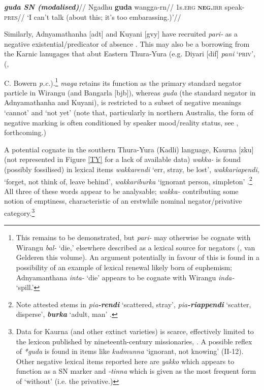 \documentclass[usenames,dvipsnames,11pt]{article}
\begin{document}
{\a\begingl\glpreamble \textbf{\em{guda} SN (modalised)}//
\gla Ngadhu \textbf{guda} wangga-rn//
\glb 1s.\textsc{erg} \textsc{\textbf{neg.}irr} speak\textsc{-pres}//
\glft`I can't talk (about this; it's too embarassing.)'//\endgl
\xe


 Similarly, Adnyamathanha [\gls{adt}] and Kuyani [\gls{gvy}] have recruited \textit{pari-} as a negative existential/predicator of absence \citep[141]{Hercus1999}. This may also be a borrowing from the Karnic lanugages that abut Eastern Thura-Yura (e.g. Diyari [\gls{dif}] \textit{pani} \textsc{`priv'}, (\citealt{Austin2011}, {C. Bowern \textit{p.c.}).\footnote{This remains to be demonstrated, but \textit{pari-} may otherwise be cognate with Wirangu \textit{bal-} `die,' elsewhere described as a lexical source for negators (\citealt{Veselinova2013}, van Gelderen this volume). An argument potentially in favour of this is found in a possibility of an example of lexical renewal likely born of euphemism; Adnyamanthana \textit{inta-} `die' appears to be cognate with Wirangu \textit{inda-} `spill.'}
\textit{maga} retains its function as the primary standard negator particle in Wirangu (and Bangarla [\gls{bjb}]),  whereas \textit{guda} (the standard negator in Adnyamathanha and Kuyani), is restricted to a subset of negative meanings `cannot' and `not yet' (note that, particularly in northern Australia, the form of negative marking is often conditioned by speaker mood/reality status, see \citealt[225]{Miestamo2005}, \citeauthor{PhillipsFCb} forthcoming.)

A potential cognate in the southern Thura-Yura (Kadli) language, Kaurna [\gls{zku}] (not represented in Figure \ref{TY} for a lack of available data) \textit{wakka-} is found (possibly fossilised) in lexical items \textit{wakkarendi} `err, stray, be lost', \textit{wakkariapendi}, `forget, not think of, leave behind', \textit{wakkariburka} `ignorant person, simpleton' \citep[II-52]{Schurmann1840}.\footnote{Note attested stems in \textit{pia\textbf{-rendi}} `scattered, stray', \textit{pia\textbf{-riappendi}} `scatter, disperse', \textit{\textbf{burka}} `adult, man' \citep[II-4,38]{Schurmann1840}.} All three of these words appear to be analysable; \textit{wakka-} contributing some notion of emptiness, characteristic of an erstwhile nominal negator/privative category.\footnote{Data for Kaurna (and other extinct varieties) is scarce, effectively limited to the lexicon published by nineteenth-century missionaries, \citet{Schurmann1840}. A possible reflex of \textit{*guda} is found in items like \textit{kudmunna} `ignorant, not knowing' (II-12). Other negative lexical items reported here are \textit{yakko} which appears to function as a SN marker and \textit{-tinna} which is given as the most frequent form of `without' (i.e. the privative.)}

}}
\end{document}
